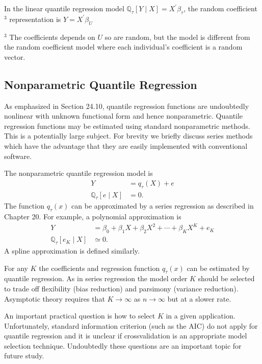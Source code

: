 \documentclass[10pt]{article}
\begin{document}
In the linear quantile regression model $\mathbb{Q}_{\tau}[Y \mid X]=X^{\prime} \beta_{\tau}$, the random coefficient ${ }^{3}$ representation is $Y=X^{\prime} \beta_{U}$

${ }^{3}$ The coefficients depends on $U$ so are random, but the model is different from the random coefficient model where each individual's coefficient is a random vector.

\subsection{Nonparametric Quantile Regression}
As emphasized in Section 24.10, quantile regression functions are undoubtedly nonlinear with unknown functional form and hence nonparametric. Quantile regression functions may be estimated using standard nonparametric methods. This is a potentially large subject. For brevity we briefly discuss series methods which have the advantage that they are easily implemented with conventional software.

The nonparametric quantile regression model is
$$
\begin{aligned}
Y &=q_{\tau}(X)+e \\
\mathbb{Q}_{\tau}[e \mid X] &=0 .
\end{aligned}
$$
The function $q_{\tau}(x)$ can be approximated by a series regression as described in Chapter 20. For example, a polynomial approximation is
$$
\begin{aligned}
Y &=\beta_{0}+\beta_{1} X+\beta_{2} X^{2}+\cdots+\beta_{K} X^{K}+e_{K} \\
\mathbb{Q}_{\tau}\left[e_{K} \mid X\right] & \simeq 0 .
\end{aligned}
$$
A spline approximation is defined similarly.

For any $K$ the coefficients and regression function $q_{\tau}(x)$ can be estimated by quantile regression. As in series regression the model order $K$ should be selected to trade off flexibility (bias reduction) and parsimony (variance reduction). Asymptotic theory requires that $K \rightarrow \infty$ as $n \rightarrow \infty$ but at a slower rate.

An important practical question is how to select $K$ in a given application. Unfortunately, standard information criterion (such as the AIC) do not apply for quantile regression and it is unclear if crossvalidation is an appropriate model selection technique. Undoubtedly these questions are an important topic for future study.
\end{document}
